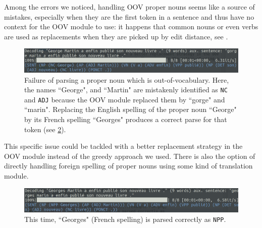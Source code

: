 \documentclass[11pt]{article}
\begin{document}
Among the errors we noticed, handling OOV proper nouns seems like a source of mistakes, especially when they are the first token in a sentence and thus have no context for the OOV module to use: it happens that common nouns or even verbs are used as replacements when they are picked up by edit distance, see .
\begin{figure}[ht!]
	\centering
	\includegraphics[width=\linewidth]{georgemartin-fail.png}
	\caption{Failure of parsing a proper noun which is out-of-vocabulary. Here, the names ``George", and ``Martin" are mistakenly identified as \lstinline|NC| and \lstinline|ADJ| because the OOV module replaced them by ``gorge" and ``marin". Replacing the English spelling of the proper noun ``George" by its French spelling ``Georges" produces a correct parse for that token (see \cref{fig:ParseWin_GeorgeRR}).}
	\label{fig:npParseFailure_GeorgeRR}
\end{figure}
This specific issue could be tackled with a better replacement strategy in the OOV module instead of the greedy approach we used. There is also the option of directly handling foreign spelling of proper nouns using some kind of translation module.
\begin{figure}[h]
	\centering
	\includegraphics[width=\linewidth]{../example-run.png}
	\caption{This time, ``Georges" (French spelling) is parsed correctly as \lstinline|NPP|.}\label{fig:ParseWin_GeorgeRR}
\end{figure}




\printbibliography{}
\end{document}
